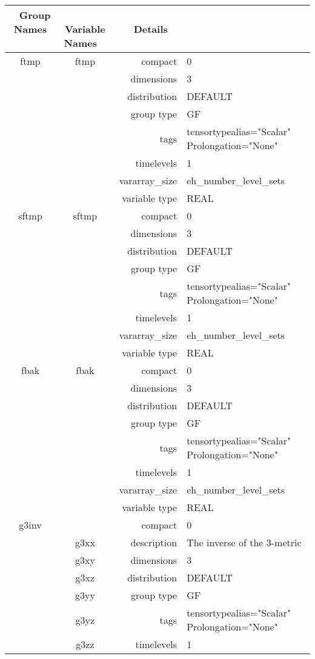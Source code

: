 \begin{tabular*}{150mm}{|c|c@{\extracolsep{\fill}}|rl|} \hline 
~ {\bf Group Names} ~ & ~ {\bf Variable Names} ~  &{\bf Details} ~ & ~ \\ 
\hline 
ftmp & ftmp & compact & 0 \\ 
 &  & dimensions & 3 \\ 
 &  & distribution & DEFAULT \\ 
 &  & group type & GF \\ 
 &  & tags & tensortypealias="Scalar" Prolongation="None" \\ 
 &  & timelevels & 1 \\ 
 &  & vararray\_size & eh\_number\_level\_sets \\ 
 &  & variable type & REAL \\ 
\hline 
sftmp & sftmp & compact & 0 \\ 
 &  & dimensions & 3 \\ 
 &  & distribution & DEFAULT \\ 
 &  & group type & GF \\ 
 &  & tags & tensortypealias="Scalar" Prolongation="None" \\ 
 &  & timelevels & 1 \\ 
 &  & vararray\_size & eh\_number\_level\_sets \\ 
 &  & variable type & REAL \\ 
\hline 
fbak & fbak & compact & 0 \\ 
 &  & dimensions & 3 \\ 
 &  & distribution & DEFAULT \\ 
 &  & group type & GF \\ 
 &  & tags & tensortypealias="Scalar" Prolongation="None" \\ 
 &  & timelevels & 1 \\ 
 &  & vararray\_size & eh\_number\_level\_sets \\ 
 &  & variable type & REAL \\ 
\hline 
g3inv &  & compact & 0 \\ 
 & g3xx & description & The inverse of the 3-metric \\ 
 & g3xy & dimensions & 3 \\ 
 & g3xz & distribution & DEFAULT \\ 
 & g3yy & group type & GF \\ 
 & g3yz & tags & tensortypealias="Scalar" Prolongation="None" \\ 
 & g3zz & timelevels & 1 \\ 

\end{tabular*}
